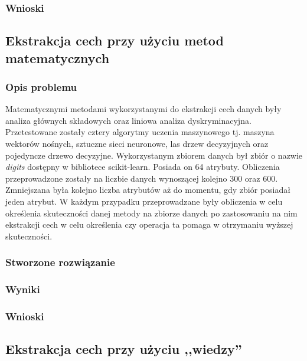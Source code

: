 \subsubsection{Wnioski}

\subsection{Ekstrakcja cech przy użyciu metod matematycznych}

\subsubsection{Opis problemu}
Matematycznymi metodami wykorzystanymi do ekstrakcji cech danych były analiza głównych składowych oraz liniowa analiza dyskryminacyjna. Przetestowane zostały cztery algorytmy uczenia maszynowego tj. maszyna wektorów nośnych, sztuczne sieci neuronowe, las drzew decyzyjnych oraz pojedyncze drzewo decyzyjne. Wykorzystanym zbiorem danych był zbiór o nazwie \textit{digits} dostępny w bibliotece scikit-learn. Posiada on 64 atrybuty. Obliczenia przeprowadzone zostały na liczbie danych wynoszącej kolejno 300 oraz 600. Zmniejszana była kolejno liczba atrybutów aż do momentu, gdy zbiór posiadał jeden atrybut. W każdym przypadku przeprowadzane były obliczenia w celu określenia skuteczności danej metody na zbiorze danych po zastosowaniu na nim ekstrakcji cech w celu określenia czy operacja ta pomaga w otrzymaniu wyższej skuteczności.

\subsubsection{Stworzone rozwiązanie}
\subsubsection{Wyniki}
\subsubsection{Wnioski}

\subsection{Ekstrakcja cech przy użyciu ,,wiedzy''}
